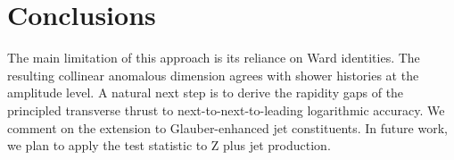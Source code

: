 \section{Conclusions}\label{sec:conclusions}

The main limitation of this approach is its reliance on Ward identities.
The resulting collinear anomalous dimension agrees with shower histories
at the amplitude level. A natural next step is to derive the rapidity
gaps of the principled transverse thrust to next-to-next-to-leading
logarithmic accuracy. We comment on the extension to Glauber-enhanced
jet constituents. In future work, we plan to apply the test statistic to
Z plus jet production.


